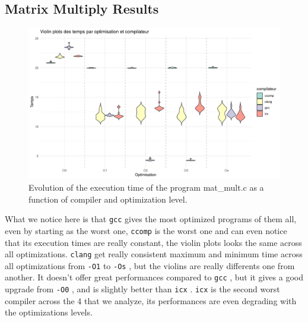 \documentclass{rapport}
\newcommand{\gcc}{\texttt{gcc} }
\newcommand{\icx}{\texttt{icx} }
\newcommand{\clang}{\texttt{clang} }
\newcommand{\comp}{\texttt{ccomp} }
\newcommand{\optizero}{\texttt{-O0} }
\newcommand{\optione}{\texttt{-O1} }
\newcommand{\optisize}{\texttt{-Os} }
\begin{document}
\subsection{Matrix Multiply Results}
\begin{figure}[H]
\centering
\includegraphics[width=1\textwidth]{img/plots/violin_plot_mat_mult.png}
\caption{Evolution of the execution time of the program mat\_mult.c as a function of compiler and optimization level.}
\label{fig:image1}
\end{figure}
What we notice here is that \gcc gives the most optimized programs of them all, even by starting as the worst one, 
\comp is the worst one and can even notice that its execution times are really constant, the violin plots looks the same across all optimizations. \newline
\clang get really consistent maximum and minimum time across all optimizations from \optione to \optisize, but the violins are really differents one from another.
It doesn't offer great performances compared to \gcc, but it gives a good upgrade from \optizero, and is slightly better than \icx. \newline
\icx is the second worst compiler across the 4 that we analyze, its performances are even degrading with the optimizations levels.
\end{document}
